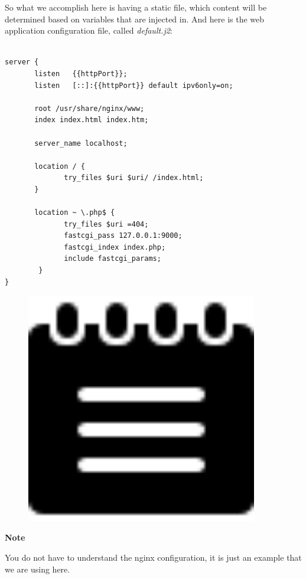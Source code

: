 \documentclass[10pt]{book}
\begin{document}
So what we accomplish here is having a static file, which content will be determined based on 
variables that are injected in. And here is the web application configuration file, called \emph{default.j2}:

\begin{verbatim}
  
server {
       listen   {{httpPort}}; 
       listen   [::]:{{httpPort}} default ipv6only=on; 

       root /usr/share/nginx/www;
       index index.html index.htm;

       server_name localhost;

       location / {
              try_files $uri $uri/ /index.html;
       }
       
       location ~ \.php$ {
              try_files $uri =404;
              fastcgi_pass 127.0.0.1:9000;
              fastcgi_index index.php;
              include fastcgi_params;
      	}
}

\end{verbatim}

\begin{mdframed}[style=noteStyle]
\begin{minipage}[b]{0.05\textwidth}
\begin{figure}[H]
\includegraphics[width=0.9\textwidth]{figures/notes-icon.png} 
\end{figure}
\end{minipage}  
\begin{minipage}[b]{0.05\textwidth}
\textbf{Note}
\end{minipage}

You do not have to understand the nginx configuration, it is just an example 
that we are using here.

\end{mdframed}
 
\end{document}
